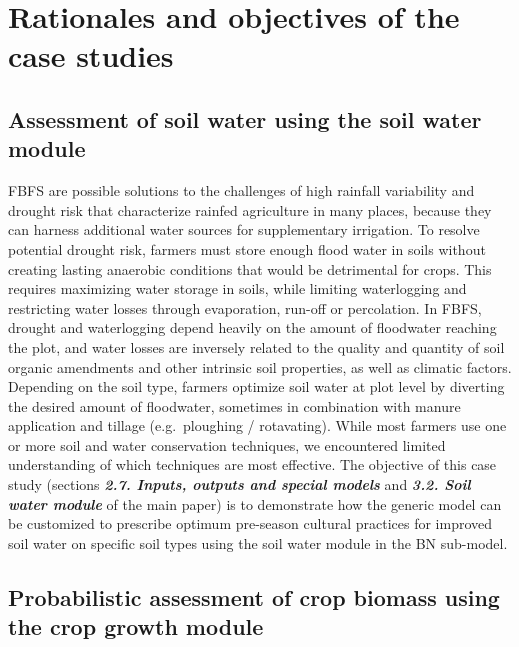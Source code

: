 \documentclass[]{elsarticle} %
\begin{document}
\hypertarget{refs5}{%
\section{Rationales and objectives of the case studies}\label{refs5}}

\hypertarget{refs51}{%
\subsection{Assessment of soil water using the soil water module}\label{refs51}}

FBFS are possible solutions to the challenges of high rainfall variability and drought risk that characterize rainfed agriculture in many places, because they can harness additional water sources for supplementary irrigation. To resolve potential drought risk, farmers must store enough flood water in soils without creating lasting anaerobic conditions that would be detrimental for crops. This requires maximizing water storage in soils, while limiting waterlogging and restricting water losses through evaporation, run-off or percolation. In FBFS, drought and waterlogging depend heavily on the amount of floodwater reaching the plot, and water losses are inversely related to the quality and quantity of soil organic amendments and other intrinsic soil properties, as well as climatic factors. Depending on the soil type, farmers optimize soil water at plot level by diverting the desired amount of floodwater, sometimes in combination with manure application and tillage (e.g.~ploughing / rotavating). While most farmers use one or more soil and water conservation techniques, we encountered limited understanding of which techniques are most effective. The objective of this case study (sections \textbf{\emph{2.7. Inputs, outputs and special models}} and \textbf{\emph{3.2. Soil water module}} of the main paper) is to demonstrate how the generic model can be customized to prescribe optimum pre-season cultural practices for improved soil water on specific soil types using the soil water module in the BN sub-model.

\hypertarget{refs52}{%
\subsection{Probabilistic assessment of crop biomass using the crop growth module}\label{refs52}}
\end{document}
